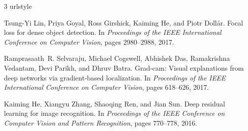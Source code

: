 \documentclass{article}
\begin{document}

\begin{thebibliography}{3}
\providecommand{\natexlab}[1]{#1}
\providecommand{\url}[1]{\texttt{#1}}
\expandafter\ifx\csname urlstyle\endcsname\relax
  \providecommand{\doi}[1]{doi: #1}\else
  \providecommand{\doi}{doi: \begingroup \urlstyle{rm}\Url}\fi

Tsung-Yi Lin, Priya Goyal, Ross Girshick, Kaiming He, and Piotr Doll{\'a}r.
\newblock Focal loss for dense object detection.
\newblock In \emph{Proceedings of the IEEE International Conference on Computer Vision}, pages 2980--2988, 2017.

Ramprasaath~R. Selvaraju, Michael Cogswell, Abhishek Das, Ramakrishna Vedantam, Devi Parikh, and Dhruv Batra.
\newblock Grad-cam: Visual explanations from deep networks via gradient-based localization.
\newblock In \emph{Proceedings of the IEEE International Conference on Computer Vision}, pages 618--626, 2017.

Kaiming He, Xiangyu Zhang, Shaoqing Ren, and Jian Sun.
\newblock Deep residual learning for image recognition.
\newblock In \emph{Proceedings of the IEEE Conference on Computer Vision and Pattern Recognition}, pages 770--778, 2016.

\end{thebibliography}
\end{document}
